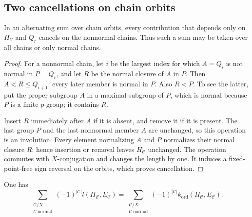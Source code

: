 \subsection{Two cancellations on chain orbits}

\begin{lemma}\label{lem:nonnormal-cancellation}
In an alternating sum over chain orbits, every contribution that
depends only on $H_{\mathcal C}$ and $Q_r$ cancels on the nonnormal
chains. Thus such a sum may be taken over all chains or only normal
chains.
\end{lemma}

\begin{proof}
For a nonnormal chain, let $i$ be the largest index for which
$A=Q_i$ is not normal in $P=Q_r$, and let $R$ be the normal closure
of $A$ in $P$. Then $A<R\leq Q_{i+1}$: every later member is
normal in $P$. Also $R<P$. To see the latter, put the proper
subgroup $A$ in a maximal subgroup of $P$, which is normal because
$P$ is a finite $p$-group; it contains $R$.

Insert $R$ immediately after $A$ if it is absent, and remove it
if it is present. The last group $P$ and the last nonnormal member
$A$ are unchanged, so this operation is an involution. Every
element normalizing $A$ and $P$ normalizes their normal closure
$R$; hence insertion or removal leaves $H_{\mathcal C}$ unchanged.
The operation commutes with $X$-conjugation and changes the length
by one. It induces a fixed-point-free sign reversal on the orbits,
which proves cancellation.
\end{proof}

\begin{lemma}
\label{lem:alternating-subsections}
One has
\begin{equation}\label{eq:alternating-subsections}
 \sum_{\substack{\mathcal C/X\\\mathcal C\ \mathrm{normal}}}
 (-1)^{|\mathcal C|}l(H_{\mathcal C},E_{\mathcal C})
 =
 \sum_{\substack{\mathcal C/X\\\mathcal C\ \mathrm{normal}}}
 (-1)^{|\mathcal C|}k_{\mathrm{ord}}(H_{\mathcal C},E_{\mathcal C}).
\end{equation}
\end{lemma}

